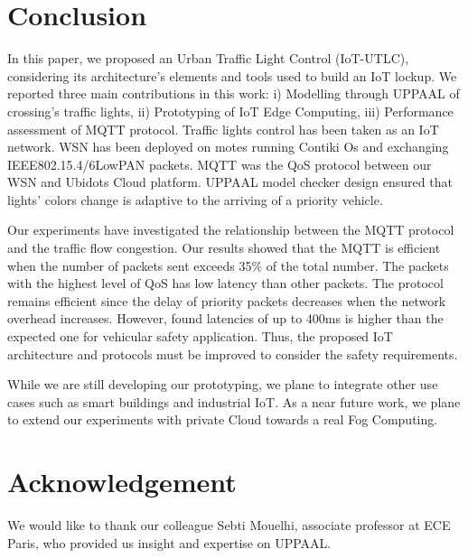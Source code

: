 \section{Conclusion} \label{Sec:Conclusion}

In this paper,
	we proposed an Urban Traffic Light Control (IoT-UTLC),
	considering its architecture’s elements and tools used to build an IoT lockup.
We reported three main contributions in this work:
	i) Modelling through UPPAAL of crossing's traffic lights,
	ii) Prototyping of IoT Edge Computing,
	iii) Performance assessment of MQTT protocol.
Traffic lights control has been taken as an IoT network.
WSN has been deployed on motes running Contiki Os and exchanging IEEE802.15.4/6LowPAN packets.
MQTT was the QoS protocol between our WSN and Ubidots Cloud platform.
UPPAAL model checker design ensured that lights' colors change is adaptive to the arriving of a priority vehicle.

Our experiments have investigated the relationship between the MQTT protocol and the traffic flow congestion.
Our results showed that the MQTT is efficient when the number of packets sent exceeds 35\% of the total number.
The packets with the highest level of QoS has low latency than other packets.
The protocol remains efficient since the delay of priority packets decreases when the network overhead increases.
However,
	found latencies of up to 400ms is higher than the expected one for vehicular safety application.
Thus,
	the proposed IoT architecture and protocols must be improved to consider the safety requirements.

While we are still developing our prototyping,
	we plane to integrate other use cases such as smart buildings and industrial IoT.
As a near future work,
	we plane to extend our experiments with private Cloud towards a real Fog Computing.

\section*{Acknowledgement}

We would like to thank our colleague Sebti Mouelhi,
	associate professor at ECE Paris,
	who provided us insight and expertise on UPPAAL.
